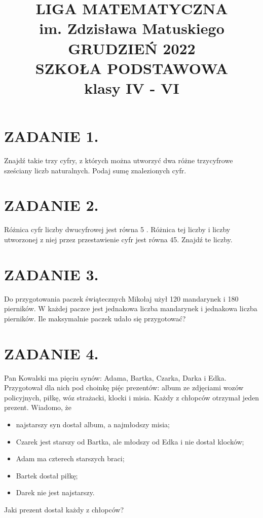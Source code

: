 \documentclass[10pt]{article}
\title{LIGA MATEMATYCZNA \\
 im. Zdzisława Matuskiego GRUDZIEŃ 2022 \\
 SZKOŁA PODSTAWOWA \\
 klasy IV - VI }
\author{}
\date{}
\begin{document}
\maketitle
\section*{ZADANIE 1.}
Znajdź takie trzy cyfry, z których można utworzyć dwa różne trzycyfrowe sześciany liczb naturalnych. Podaj sumę znalezionych cyfr.

\section*{ZADANIE 2.}
Różnica cyfr liczby dwucyfrowej jest równa 5 . Różnica tej liczby i liczby utworzonej z niej przez przestawienie cyfr jest równa 45. Znajdź te liczby.

\section*{ZADANIE 3.}
Do przygotowania paczek świątecznych Mikołaj użył 120 mandarynek i 180 pierników. W każdej paczce jest jednakowa liczba mandarynek i jednakowa liczba pierników. Ile maksymalnie paczek udało się przygotować?

\section*{ZADANIE 4.}
Pan Kowalski ma pięciu synów: Adama, Bartka, Czarka, Darka i Edka. Przygotował dla nich pod choinkę pię́c prezentów: album ze zdjęciami wozów policyjnych, piłkę, wóz strażacki, klocki i misia. Każdy z chłopców otrzymał jeden prezent. Wiadomo, że

\begin{itemize}
  \item najstarszy syn dostał album, a najmłodszy misia;
  \item Czarek jest starszy od Bartka, ale młodszy od Edka i nie dostał klocków;
  \item Adam ma czterech starszych braci;
  \item Bartek dostał piłkę;
  \item Darek nie jest najstarszy.
\end{itemize}

Jaki prezent dostał każdy z chłopców?
\end{document}
